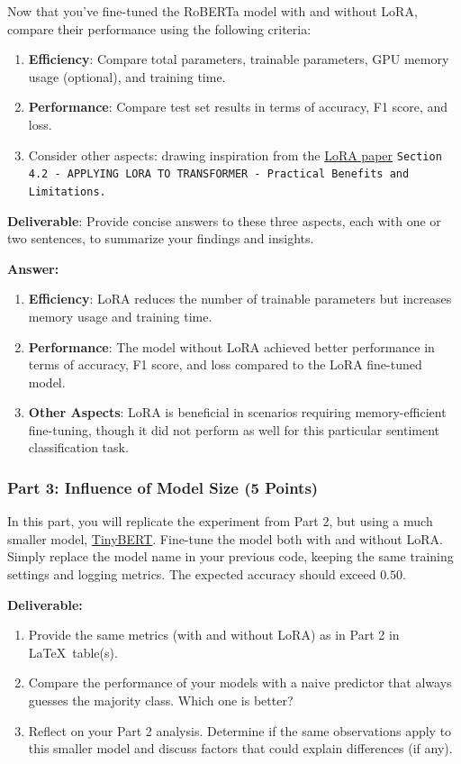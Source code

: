 \documentclass[11pt, oneside]{article}   	%
\begin{document}
Now that you've fine-tuned the RoBERTa model with and without LoRA, compare their performance using the following criteria:
\begin{enumerate}
    \item \textbf{Efficiency}: Compare total parameters, trainable parameters, GPU memory usage (optional), and training time.
    \item \textbf{Performance}: Compare test set results in terms of accuracy, F1 score, and loss.
    \item Consider other aspects: drawing inspiration from the \href{https://arxiv.org/abs/2106.09685}{LoRA paper} \texttt{Section 4.2 - APPLYING LORA TO TRANSFORMER - Practical Benefits and Limitations.}
\end{enumerate}
\textbf{Deliverable}: Provide concise answers to these three aspects, each with one or two sentences, to summarize your findings and insights.

\textbf{Answer:} \\

\begin{enumerate}
    \item \textbf{Efficiency}: LoRA reduces the number of trainable parameters but increases memory usage and training time.
    \item \textbf{Performance}: The model without LoRA achieved better performance in terms of accuracy, F1 score, and loss compared to the LoRA fine-tuned model.
    \item \textbf{Other Aspects}: LoRA is beneficial in scenarios requiring memory-efficient fine-tuning, though it did not perform as well for this particular sentiment classification task.
\end{enumerate}


\subsubsection*{Part 3: Influence of Model Size (5 Points)}
In this part, you will replicate the experiment from Part 2, but using a much smaller model, \href{https://huggingface.co/huawei-noah/TinyBERT_General_4L_312D}{TinyBERT}. 
Fine-tune the model both with and without LoRA. Simply replace the model name in your previous code, keeping the same training settings and logging metrics. The expected accuracy should exceed $0.50$.

\textbf{Deliverable:}
\begin{enumerate}
    \item Provide the same metrics (with and without LoRA) as in Part 2 in \LaTeX~table(s).
    \item Compare the performance of your models with a naive predictor that always guesses the majority class. Which one is better?
    \item Reflect on your Part 2 analysis. Determine if the same observations apply to this smaller model and discuss factors that could explain differences (if any).
\end{enumerate}
\end{document}
